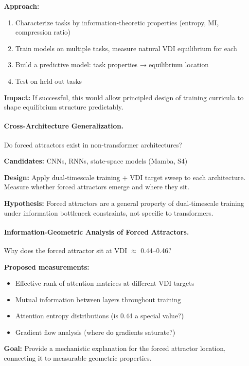 \textbf{Approach:}
\begin{enumerate}
\item Characterize tasks by information-theoretic properties (entropy, MI, compression ratio)
\item Train models on multiple tasks, measure natural VDI equilibrium for each
\item Build a predictive model: task properties → equilibrium location
\item Test on held-out tasks
\end{enumerate}

\textbf{Impact:} If successful, this would allow principled design of training curricula to shape equilibrium structure predictably.

\paragraph{Cross-Architecture Generalization.}
Do forced attractors exist in non-transformer architectures?

\textbf{Candidates:} CNNs, RNNs, state-space models (Mamba, S4)

\textbf{Design:} Apply dual-timescale training + VDI target sweep to each architecture. Measure whether forced attractors emerge and where they sit.

\textbf{Hypothesis:} Forced attractors are a general property of dual-timescale training under information bottleneck constraints, not specific to transformers.

\paragraph{Information-Geometric Analysis of Forced Attractors.}
Why does the forced attractor sit at VDI $\approx$ 0.44--0.46?

\textbf{Proposed measurements:}
\begin{itemize}
\item Effective rank of attention matrices at different VDI targets
\item Mutual information between layers throughout training
\item Attention entropy distributions (is 0.44 a special value?)
\item Gradient flow analysis (where do gradients saturate?)
\end{itemize}

\textbf{Goal:} Provide a mechanistic explanation for the forced attractor location, connecting it to measurable geometric properties.

